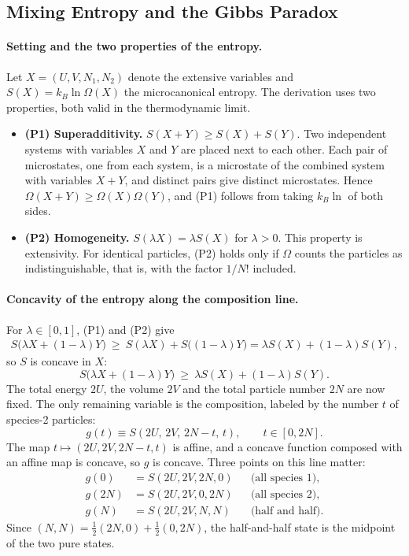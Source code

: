 \subsection{Mixing Entropy and the Gibbs Paradox}

\paragraph{Setting and the two properties of the entropy.}
Let $X=(U,V,N_1,N_2)$ denote the extensive variables and
$S(X)=k_B\ln\Omega(X)$ the microcanonical entropy. The derivation uses two
properties, both valid in the thermodynamic limit.
\begin{itemize}
    \item \textbf{(P1) Superadditivity.} $S(X+Y)\ge S(X)+S(Y)$.
    Two independent systems with variables $X$ and $Y$ are placed next to
    each other. Each pair of microstates, one from each system, is a
    microstate of the combined system with variables $X+Y$, and distinct
    pairs give distinct microstates. Hence $\Omega(X+Y)\ge\Omega(X)\Omega(Y)$,
    and (P1) follows from taking $k_B\ln$ of both sides.
    \item \textbf{(P2) Homogeneity.} $S(\lambda X)=\lambda S(X)$ for
    $\lambda>0$. This property is extensivity. For identical particles, (P2)
    holds only if $\Omega$ counts the particles as indistinguishable, that
    is, with the factor $1/N!$ included.
\end{itemize}

\paragraph{Concavity of the entropy along the composition line.}
For $\lambda\in[0,1]$, (P1) and (P2) give
\begin{align*}
    S\big(\lambda X+(1-\lambda)Y\big)
    \ \ge\ S(\lambda X)+S\big((1-\lambda)Y\big)
    = \lambda S(X)+(1-\lambda)S(Y),
\end{align*}
so $S$ is concave in $X$:
\begin{equation}
    \boxed{S\big(\lambda X+(1-\lambda)Y\big)\ \ge\ \lambda S(X)+(1-\lambda)S(Y).}
\end{equation}
The total energy $2U$, the volume $2V$ and the total particle number $2N$
are now fixed. The only remaining variable is the composition, labeled by
the number $t$ of species-2 particles:
\begin{equation*}
    g(t)\equiv S(2U,\,2V,\,2N-t,\,t),\qquad t\in[0,2N].
\end{equation*}
The map $t\mapsto(2U,2V,2N-t,t)$ is affine, and a concave function composed
with an affine map is concave, so $g$ is concave. Three points on this line
matter:
\begin{align*}
    g(0)&=S(2U,2V,2N,0) &&\text{(all species 1)},\\
    g(2N)&=S(2U,2V,0,2N) &&\text{(all species 2)},\\
    g(N)&=S(2U,2V,N,N) &&\text{(half and half)}.
\end{align*}
Since $(N,N)=\tfrac12(2N,0)+\tfrac12(0,2N)$, the half-and-half state is the
midpoint of the two pure states.

